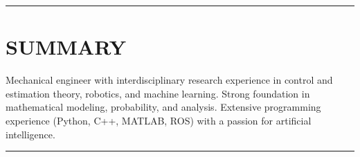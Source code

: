 \documentclass{res}
\begin{document}
\address{evangravelle@gmail.com $\cdot$ (805) 205-4318 $\cdot$ github/evangravelle}

 
\begin{resume}

%
% 
%

\vspace*{-3ex}
\hspace{-8.5ex}\rule{16.5cm}{0.4pt}
\vspace*{-3ex}
\section{SUMMARY}
\vspace{1ex}
Mechanical engineer with interdisciplinary research experience in control and estimation theory, robotics, and machine learning. Strong foundation in mathematical modeling, probability, and analysis. Extensive programming experience (Python, C++, MATLAB, ROS) with a passion for artificial intelligence. 

\vspace*{-3ex}
\hspace{-8.5ex}\rule{16.5cm}{0.4pt}
\vspace*{-3ex}

\end{resume}
\end{document}
